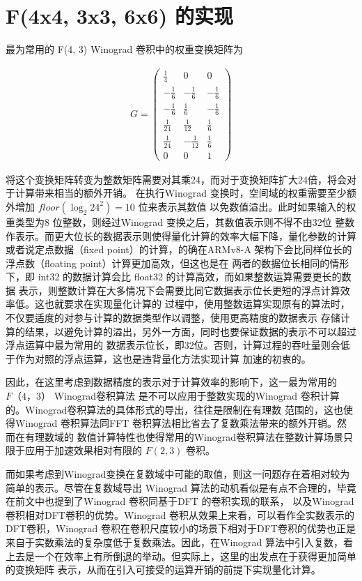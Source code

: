 
\section{F(4x4, 3x3, 6x6) 的实现}

最为常用的 F(4, 3) Winograd 卷积中的权重变换矩阵为

\begin{align}
\label{eq:winograd_f43}
  G = 
  \begin{pmatrix}
    \frac{1}{4} & 0 & 0 \\
    -\frac{1}{6} & -\frac{1}{6} & -\frac{1}{6} \\
    -\frac{1}{6} & \frac{1}{6} & -\frac{1}{6} \\
    \frac{1}{24} & \frac{1}{12} & \frac{1}{6} \\
    \frac{1}{24} & -\frac{1}{12} & \frac{1}{6} \\
    0 & 0 & 1
  \end{pmatrix}
\end{align}

将这个变换矩阵转变为整数矩阵需要对其乘24，而对于变换矩阵扩大24倍，将会对于计算带来相当的额外开销。
在执行Winograd 变换时，空间域的权重需要至少额外增加 $floor(\log_{2}{24^2}) = 10$ 位来表示其数值
以免数值溢出。此时如果输入的权重类型为8 位整数，则经过Winograd 变换之后，其数值表示则不得不由32位
整数作表示。而更大位长的数据表示则使得量化计算的效率大幅下降，量化参数的计算或者说定点数据（fixed 
point）的计算，的确在ARMv8-A 架构下会比同样位长的浮点数（floating point）计算更加高效，但这也是在
两者的数据位长相同的情形下，即 int32 的数据计算会比 float32 的计算高效，而如果整数运算需要更长的数据
表示，则整数计算在大多情况下会需要比同它数据表示位长更短的浮点计算效率低。这也就要求在实现量化计算的
过程中，使用整数运算实现原有的算法时，不仅要适度的对参与计算的数据类型作以调整，使用更高精度的数据表示
存储计算的结果，以避免计算的溢出，另外一方面，同时也要保证数据的表示不可以超过浮点运算中最为常用的
数据表示位长，即32位。否则，计算过程的吞吐量则会低于作为对照的浮点运算，这也是违背量化方法实现计算
加速的初衷的。

因此，在这里考虑到数据精度的表示对于计算效率的影响下，这一最为常用的 $F（4， 3）$ Winograd卷积算法
是不可以应用于整数实现的Winograd 卷积计算的。Winograd卷积算法的具体形式的导出，往往是限制在有理数
范围的，这也使得Winograd 卷积算法同FFT 卷积算法相比省去了复数乘法带来的额外开销。然而在有理数域的
数值计算特性也使得常用的Winograd卷积算法在整数计算场景只限于应用于加速效果相对有限的 $F(2, 3)$ 卷积。

而如果考虑到Winograd变换在复数域中可能的取值，则这一问题存在着相对较为简单的表示。尽管在复数域导出
Winograd 算法的动机看似是有点不合理的，毕竟在前文中也提到了Winograd 卷积同基于DFT 的卷积实现的联系，
以及Winograd 卷积相对DFT卷积的优势。Winograd 卷积从效果上来看，可以看作全实数表示的DFT卷积，Winograd
卷积在卷积尺度较小的场景下相对于DFT卷积的优势也正是来自于实数乘法的复杂度低于复数乘法。因此，在Winograd
算法中引入复数，看上去是一个在效率上有所倒退的举动。但实际上，这里的出发点在于获得更加简单的变换矩阵
表示，从而在引入可接受的运算开销的前提下实现量化计算。

